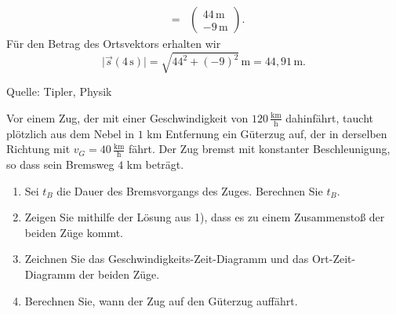 \begin{MExercises}
\begin{MExercise}
\begin{MSolution}
\begin{enumerate}
\begin{eqnarray*}
          &=&\left(\begin{array}{c} 44\,\text{m} \\ -9\,\text{m} \end{array}\right).
    \end{eqnarray*} F\"ur den Betrag des Ortsvektors erhalten wir
     \begin{equation*}
     \vert \vec{s}(4\,\text{s})\vert=\sqrt{44^2+(-9)^2}\,\text{m}={44,91}\,\text{m}.
     \end{equation*}
     \end{enumerate}
     
     \end{MSolution}
     
     Quelle: Tipler, Physik
     \end{MExercise}
     
     
    
     
     \begin{MExercise}
     Vor einem Zug, der mit einer Geschwindigkeit von $120 \,\frac{\text{km}}{\text{h}}$ dahinf\"ahrt, taucht pl\"otzlich aus dem Nebel in $1$ km Entfernung ein G\"uterzug auf, der in derselben Richtung mit $v_G=40\, \frac{\text{km}}{\text{h}}$ f\"ahrt. Der Zug bremst mit konstanter Beschleunigung, so dass sein Bremsweg $4$ km betr\"agt.
     \begin{enumerate}
     \item Sei $t_B$ die Dauer des Bremsvorgangs des Zuges. Berechnen Sie $t_B$.
     \item Zeigen Sie mithilfe der L\"osung aus 1), dass es zu einem Zusammensto{\ss} der beiden Z\"uge kommt.
     \item Zeichnen Sie das Geschwindigkeits-Zeit-Diagramm und das Ort-Zeit-Diagramm der beiden Z\"uge.
     \item Berechnen Sie, wann der Zug auf den G\"uterzug auf\/f\"ahrt.
     \end{enumerate}
     

\end{MExercise}
\end{MExercises}

